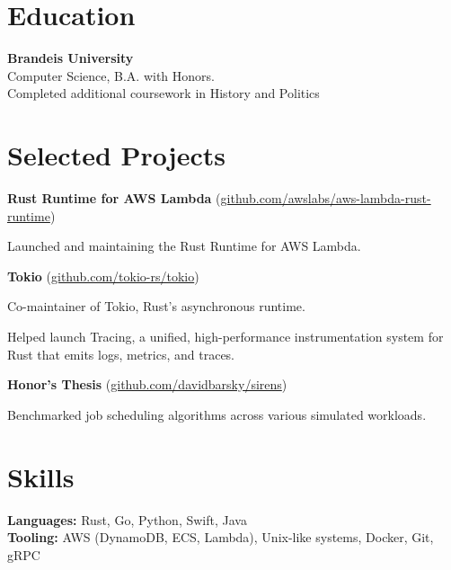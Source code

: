 \documentclass[10pt, a4paper]{article}
\newcommand{\note}[1]{\marginnote{\scriptsize #1}}
\renewenvironment{itemize}[1]{\begin{compactitem}#1}{\end{compactitem}}
\begin{document}
\section*{\textbf{Education}}
\note{Fall 2013—2017}\textbf{Brandeis University}\\
Computer Science, B.A. with Honors. \\
Completed additional coursework in History and Politics

\section*{\textbf{Selected Projects}}


\textbf{Rust Runtime for AWS Lambda} (\href{https://github.com/awslabs/aws-lambda-rust-runtime}{github.com/awslabs/aws-lambda-rust-runtime})
\begin{itemize}
    \item Launched and maintaining the Rust Runtime for AWS Lambda.
\end{itemize}

\textbf{Tokio} (\href{https://github.com/tokio-rs/tokio}{github.com/tokio-rs/tokio})
\begin{itemize}
    \item Co-maintainer of Tokio, Rust's asynchronous runtime.
    \item Helped launch Tracing, a unified, high-performance instrumentation system for Rust that emits logs, metrics, and traces.
\end{itemize}

\textbf{Honor's Thesis} (\href{https://github.com/davidbarsky/sirens}{github.com/davidbarsky/sirens})
\begin{itemize}
    \item Benchmarked job scheduling algorithms across various simulated workloads.
\end{itemize}

\section*{\textbf{Skills}}
\textbf{Languages:} Rust, Go, Python, Swift, Java \\
\textbf{Tooling:} AWS (DynamoDB, ECS, Lambda), Unix-like systems, Docker, Git, gRPC
\end{document}
